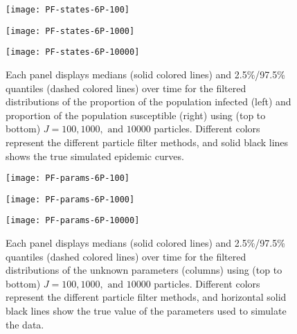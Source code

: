 \documentclass{article}
\begin{document}
\begin{figure}[ht]
\centering
\begin{minipage}{1.0\linewidth}
\texttt{[image: PF-states-6P-100]}
\end{minipage}
\begin{minipage}{1.0\linewidth}
\texttt{[image: PF-states-6P-1000]}
\end{minipage}
\begin{minipage}{1.0\linewidth}
\texttt{[image: PF-states-6P-10000]}
\end{minipage}
\caption{Each panel displays medians (solid colored lines) and 2.5\%/97.5\% quantiles (dashed colored lines) over time for the filtered distributions of the proportion of the population infected (left) and proportion of the population susceptible (right) using (top to bottom) $J = 100, 1000, \mbox{ and } 10000$ particles.  Different colors represent the different particle filter methods, and solid black lines shows the true simulated epidemic curves.} \label{fig:states6P}
\end{figure}

\begin{figure}[ht]
\centering
\begin{minipage}{1.1\linewidth}
\texttt{[image: PF-params-6P-100]}
\end{minipage}
\begin{minipage}{1.1\linewidth}
\texttt{[image: PF-params-6P-1000]}
\end{minipage}
\begin{minipage}{1.1\linewidth}
\texttt{[image: PF-params-6P-10000]}
\end{minipage}
\caption{Each panel displays medians (solid colored lines) and 2.5\%/97.5\% quantiles (dashed colored lines) over time for the filtered distributions of the unknown parameters (columns) using (top to bottom) $J = 100, 1000, \mbox{ and } 10000$ particles.  Different colors represent the different particle filter methods, and horizontal solid black lines show the true value of the parameters used to simulate the data.} \label{fig:params6P}
\end{figure}
\end{document}
